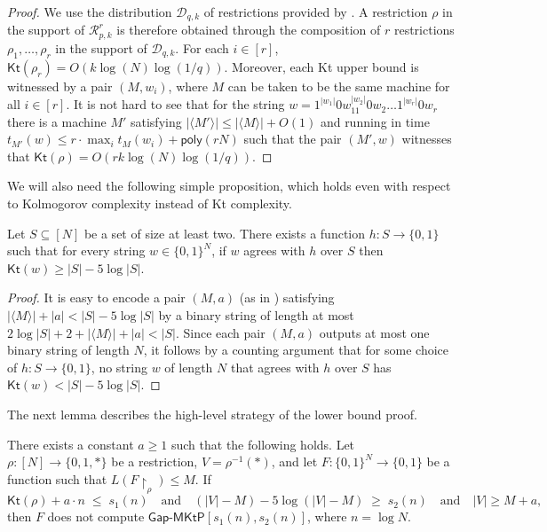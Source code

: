 \documentclass{toc}
\newcommand{\gapmktp}{\mathsf{Gap}$-$\mathsf{MKtP}}
\newcommand{\Kt}{\mathsf{Kt}}
\begin{document}
\begin{proof}
We use the distribution $\mathcal{D}_{q,k}$ of restrictions provided by .  A restriction $\rho$ in the support of $\mathcal{R}^r_{p,k}$ is therefore obtained through the composition of $r$ restrictions $\rho_1, \ldots, \rho_r$ in the support of $\mathcal{D}_{q,k}$. For each $i \in [r]$, $\Kt(\rho_r) = O(k \log (N) \log (1/q))$. Moreover, each Kt upper bound is witnessed by a pair $(M,w_{i})$, where $M$ can be taken to be the same machine for all $i \in [r]$. It is not hard to see that for the string $w = 1^{|w_1|}0w_11^{|w_2|}0w_2 \ldots 1^{|w_r|}0w_r$ there is a machine $M'$ satisfying $|\langle M' \rangle | \leq |\langle M \rangle| + O(1)$ and running in time $t_{M'}(w) \leq r \cdot \max_{i} t_{M}(w_i) + \mathsf{poly}(rN)$ such that the pair $(M',w)$ witnesses that $\Kt(\rho) = O(r k \log (N) \log (1/q))$.
\end{proof}

We will also need the following simple proposition, which holds even with respect to Kolmogorov complexity instead of Kt complexity.



\begin{proposition}\label{p:hard_function}
Let $S \subseteq [N]$ be a set of size at least two. There exists a function $h \colon S \to \{0,1\}$ such that for every string $w \in \{0,1\}^N$, if $w$ agrees with $h$ over $S$ then $\Kt(w) \geq |S| - 5\log |S|$.
\end{proposition}

\begin{proof}
It is easy to encode a pair $(M,a)$ (as in ) satisfying $|\langle M \rangle | + |a| < |S| - 5 \log |S|$ by a binary string of length at most $2\log |S| + 2 + |\langle M \rangle | + |a| < |S|$. Since each pair $(M,a)$ outputs at most one binary string of length $N$, it follows by a counting argument that for some choice of $h \colon S \to \{0,1\}$, no string $w$ of length $N$ that agrees with $h$ over $S$ has $\Kt(w) < |S| - 5 \log |S|$.
\end{proof}

The next lemma describes the high-level strategy of the lower bound proof.

\begin{lemma}\label{l:doesnotcomputeMCSP}
There exists a constant $a \geq 1$ such that the following holds. Let $\rho \colon [N] \to \{0,1,*\}$ be a restriction, $V = \rho^{-1}(*)$, and let $F \colon \{0,1\}^N \to \{0,1\}$ be a function such that $L(F\!\upharpoonright_\rho) \leq M$. If
$$
\Kt(\rho) + a\cdot n \;\leq\; s_1(n) \quad \text{and} \quad (|V| - M) - 5 \log(|V| - M) \;\geq\; s_2(n) \quad \text{and} \quad |V| \geq M + a,
$$
then $F$ does not compute $\gapmktp[s_1(n), s_2(n)]$, where $n = \log N$.
\end{lemma}
\end{document}
